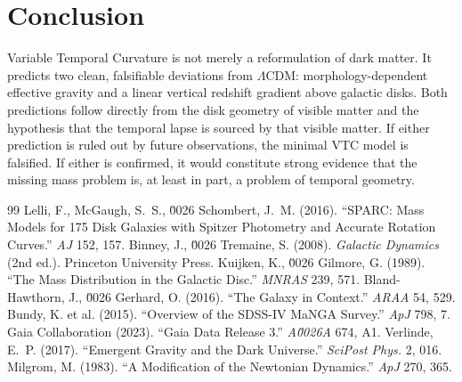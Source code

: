 \documentclass[11pt,a4paper]{article}
\theoremstyle{definition}
\begin{document}
\section{Conclusion}

Variable Temporal Curvature is not merely a reformulation of dark matter. It predicts two clean, falsifiable deviations from $\Lambda$CDM: morphology-dependent effective gravity and a linear vertical redshift gradient above galactic disks. Both predictions follow directly from the disk geometry of visible matter and the hypothesis that the temporal lapse is sourced by that visible matter. If either prediction is ruled out by future observations, the minimal VTC model is falsified. If either is confirmed, it would constitute strong evidence that the missing mass problem is, at least in part, a problem of temporal geometry.

\begin{thebibliography}{99}
 Lelli, F., McGaugh, S.~S., \u0026 Schombert, J.~M. (2016). ``SPARC: Mass Models for 175 Disk Galaxies with Spitzer Photometry and Accurate Rotation Curves.'' \textit{AJ} 152, 157.
 Binney, J., \u0026 Tremaine, S. (2008). \textit{Galactic Dynamics} (2nd ed.). Princeton University Press.
 Kuijken, K., \u0026 Gilmore, G. (1989). ``The Mass Distribution in the Galactic Disc.'' \textit{MNRAS} 239, 571.
 Bland-Hawthorn, J., \u0026 Gerhard, O. (2016). ``The Galaxy in Context.'' \textit{ARAA} 54, 529.
 Bundy, K. et al. (2015). ``Overview of the SDSS-IV MaNGA Survey.'' \textit{ApJ} 798, 7.
 Gaia Collaboration (2023). ``Gaia Data Release 3.'' \textit{A\u0026A} 674, A1.
 Verlinde, E.~P. (2017). ``Emergent Gravity and the Dark Universe.'' \textit{SciPost Phys.} 2, 016.
 Milgrom, M. (1983). ``A Modification of the Newtonian Dynamics.'' \textit{ApJ} 270, 365.
\end{thebibliography}
\end{document}
